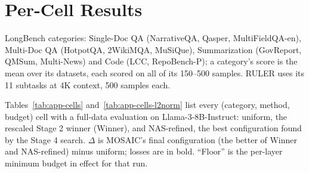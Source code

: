 \clearpage
\appendix

\section{Per-Cell Results}
\label{app:cells}


LongBench categories: Single-Doc QA (NarrativeQA, Qasper, MultiFieldQA-en), Multi-Doc QA (HotpotQA, 2WikiMQA, MuSiQue), Summarization (GovReport, QMSum, Multi-News) and Code (LCC, RepoBench-P); a category's score is the mean over its datasets, each scored on all of its 150--500 samples. RULER uses its 11 subtasks at 4K context, 500 samples each.

Tables~\ref{tab:app-cells} and~\ref{tab:app-cells-l2norm} list every (category, method, budget) cell with a full-data evaluation on Llama-3-8B-Instruct: uniform, the rescaled Stage 2 winner (Winner), and NAS-refined, the best configuration found by the Stage 4 search. $\Delta$ is MOSAIC's final configuration (the better of Winner and NAS-refined) minus uniform; losses are in bold. ``Floor'' is the per-layer minimum budget in effect for that run.

